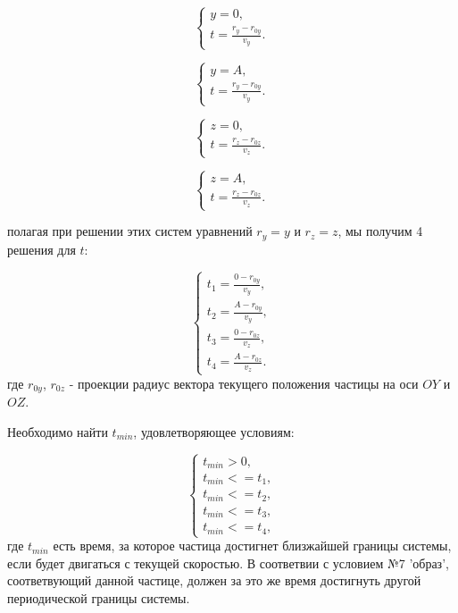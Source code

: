 \documentclass{article}
\begin{document}
\begin{equation}
    \begin{cases}
        y = 0,
        \\
        t = \displaystyle\frac{r_y - r_{0y}}{v_y}.
    \end{cases}
\end{equation}

\begin{equation}
    \begin{cases}
        y = A,
        \\
        t = \displaystyle\frac{r_y - r_{0y}}{v_y}.
    \end{cases}
\end{equation}

\begin{equation}
    \begin{cases}
        z = 0,
        \\
        t = \displaystyle\frac{r_z - r_{0z}}{v_z}.
    \end{cases}
\end{equation}

\begin{equation}
    \begin{cases}
        z = A,
        \\
        t = \displaystyle\frac{r_z - r_{0z}}{v_z}.
    \end{cases}
\end{equation}

полагая при решении этих систем уравнений $ r_y = y $ и $ r_z = z $, мы получим 4 решения для  $t$:

\begin{equation}\label{eq:t_end}
    \begin{cases}
        t_1 = \displaystyle\frac{0 - r_{0y}}{v_y},
        \\
        t_2 = \displaystyle\frac{A - r_{0y}}{v_y},
        \\
        t_3 = \displaystyle\frac{0 - r_{0z}}{v_z},
        \\
        t_4 = \displaystyle\frac{A - r_{0z}}{v_z}.
    \end{cases}
\end{equation}
где $ r_{0y} $, $ r_{0z} $ - проекции радиус вектора текущего положения частицы на оси $ OY $ и $ OZ $.

Необходимо найти $ t_{min} $, удовлетворяющее условиям:

\begin{equation}\label{eq:t_min}
    \begin{cases}
        t_{min} > 0,
        \\
        t_{min} <= t_1,
        \\
        t_{min} <= t_2,
        \\
        t_{min} <= t_3,
        \\
        t_{min} <= t_4,
    \end{cases}
\end{equation}
где $ t_{min} $ есть время, за которое частица достигнет близжайшей границы системы, если будет двигаться с текущей скоростью. В соответвии с условием №7 'образ', соответвующий данной частице, должен  за это же время достигнуть другой периодической границы системы.
\end{document}
